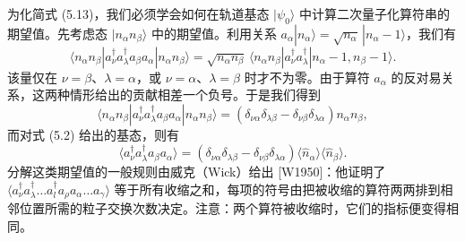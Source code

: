 为化简式 (5.13)，我们必须学会如何在轨道基态 $|\psi_0\rangle$ 中计算二次量子化算符串的期望值。先考虑态 $|n_\alpha n_\beta\rangle$ 中的期望值。利用关系 $a_\alpha|n_\alpha\rangle=\sqrt{n_\alpha}\,|n_\alpha-1\rangle$，我们有
\begin{equation*}
\langle n_\alpha n_\beta|a_\nu^\dagger a_\lambda^\dagger a_\beta a_\alpha|n_\alpha n_\beta\rangle=\sqrt{n_\alpha n_\beta}\,\langle n_\alpha n_\beta|a_\nu^\dagger a_\lambda^\dagger|n_\alpha-1,n_\beta-1\rangle.
\tag{5.15}
\end{equation*}
该量仅在 $\nu=\beta$、$\lambda=\alpha$，或 $\nu=\alpha$、$\lambda=\beta$ 时才不为零。由于算符 $a_\alpha$ 的反对易关系，这两种情形给出的贡献相差一个负号。于是我们得到
\begin{equation*}
\langle n_\alpha n_\beta|a_\nu^\dagger a_\lambda^\dagger a_\beta a_\alpha|n_\alpha n_\beta\rangle=(\delta_{\nu\alpha}\delta_{\lambda\beta}-\delta_{\nu\beta}\delta_{\lambda\alpha})n_\alpha n_\beta,
\tag{5.16}
\end{equation*}
而对式 (5.2) 给出的基态，则有
\begin{equation*}
\langle a_\nu^\dagger a_\lambda^\dagger a_\beta a_\alpha\rangle=(\delta_{\nu\alpha}\delta_{\lambda\beta}-\delta_{\nu\beta}\delta_{\lambda\alpha})\langle\widehat{n}_\alpha\rangle\langle\widehat{n}_\beta\rangle.
\tag{5.17}
\end{equation*}
分解这类期望值的一般规则由威克（Wick）给出 [W1950]：他证明了 $\langle a_\nu^\dagger a_\lambda^\dagger\ldots a_l^\dagger a_\rho a_\alpha\ldots a_\gamma\rangle$ 等于所有收缩之和，每项的符号由把被收缩的算符两两排到相邻位置所需的粒子交换次数决定。注意：两个算符被收缩时，它们的指标便变得相同。

